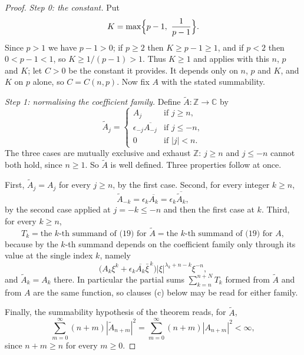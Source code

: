 \begin{proof}
\emph{Step 0: the constant.}  Put
\[
  K=\max\Bigl\{p-1,\ \frac1{p-1}\Bigr\}.
\]
Since $p>1$ we have $p-1>0$; if $p\ge2$ then $K\ge p-1\ge1$, and if $p<2$ then
$0<p-1<1$, so $K\ge1/(p-1)>1$.  Thus $K\ge1$ and 
applies with this $n$, $p$ and $K$; let $C>0$ be the constant it provides.  It
depends only on $n$, $p$ and $K$, and $K$ on $p$ alone, so $C=C(n,p)$.  Now fix
$A$ with the stated summability.

\emph{Step 1: normalising the coefficient family.}  Define
$\widetilde{A}\colon\mathbb{Z}\to\mathbb{C}$ by
\[
  \widetilde{A}_j=\begin{cases}
    A_j&\text{if }j\ge n,\\
    \epsilon_{-j}\overline{A_{-j}}&\text{if }j\le-n,\\
    0&\text{if }|j|<n .
  \end{cases}
\]
The three cases are mutually exclusive and exhaust $\mathbb{Z}$: $j\ge n$ and
$j\le-n$ cannot both hold, since $n\ge1$.  So $\widetilde{A}$ is well defined.
Three properties follow at once.

First, $\widetilde{A}_j=A_j$ for every $j\ge n$, by the first case.  Second,
for every integer $k\ge n$,
\begin{equation}\tag{1}
  \widetilde{A}_{-k}=\epsilon_{k}\overline{A_{k}}
  =\epsilon_k\overline{\widetilde{A}_k},
\end{equation}
by the second case applied at $j=-k\le-n$ and then the first case at $k$.
Third, for every $k\ge n$,
\begin{equation}\tag{2}
  T_k=\text{the }k\text{-th summand of (19) for }\widetilde{A}
  =\text{the }k\text{-th summand of (19) for }A ,
\end{equation}
because by  the $k$-th summand depends on the coefficient
family only through its value at the single index $k$, namely
\[
  \bigl(A_k\xi^k+\epsilon_k\overline{A_k}\bar\xi^{\,k}\bigr)
    |\xi|^{\lambda_k+n-k}\xi^{-n},
\]
and $\widetilde{A}_k=A_k$ there.  In particular the partial sums
$\sum_{k=n}^{n+N}T_k$ formed from $\widetilde{A}$ and from $A$ are the same
function, so clauses (c) below may be read for either family.

Finally, the summability hypothesis of the theorem reads, for $\widetilde{A}$,
\begin{equation}\tag{3}
  \sum_{m=0}^{\infty}(n+m)|\widetilde{A}_{n+m}|^2
  =\sum_{m=0}^{\infty}(n+m)|A_{n+m}|^2<\infty ,
\end{equation}
since $n+m\ge n$ for every $m\ge0$.


\end{proof}
